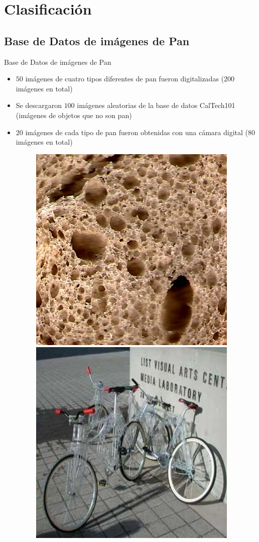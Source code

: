 \documentclass{beamer}
\begin{document}
\section{Clasificaci\'on}

\subsection{Base de Datos de im\'agenes de Pan}
\begin{frame}
{\huge Base de Datos de im\'agenes de Pan}
\begin{itemize}
\item $50$ im\'agenes de cuatro tipos diferentes de pan fueron digitalizadas ($200$ im\'agenes en total)
\item Se descargaron $100$ im\'agenes aleatorias de la base de datos CalTech101 (im\'agenes de objetos que no son pan)
\item $20$ im\'agenes de cada tipo de pan fueron obtenidas con una c\'amara digital ($80$ im\'agenes en total)
\begin{figure}
\centering
\includegraphics[scale=0.97]{../imagenes/baguette20}
\includegraphics[scale=0.2]{../exps/100sample/res/image_0351}

\end{figure}
\end{itemize}
\end{frame}
\end{document}
